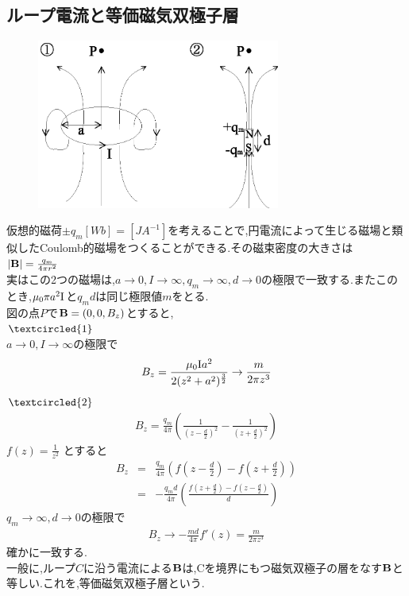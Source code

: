 \documentclass{jsarticle}
\begin{document}
\subsection{ループ電流と等価磁気双極子層}
\begin{figure}[htbp]
 \begin{center}
  \includegraphics[width=80mm]{9.5.eps}
 \end{center}
 \caption{}
 \label{fig:five}
\end{figure}
仮想的磁荷$\pm q_m [Wb]=[JA^{-1}]$を考えることで,円電流によって生じる磁場と類似したCoulomb的磁場をつくることができる.その磁束密度の大きさは
$|{\bf B}|=\frac{q_m}{4 \pi r^2}$ \\
実はこの2つの磁場は,$a \to 0,I \to \infty , q_m \to \infty ,d \to 0 $の極限で一致する.またこのとき,$\mu_0 \pi a^2 {\rm I}$と$q_md$は同じ極限値$m$をとる. \\
図の点$P$で${\bf B}=(0,0,B_z)$とすると, \\
$\textcircled{\scriptsize 1}$ \\
$a \to 0,I \to \infty$の極限で
\begin{eqnarray*}
B_z = \frac{\mu_0 {\rm I} a^2}{2(z^2+a^2)^{\frac{3}{2}}} \to \frac{m}{2 \pi z^3}
\end{eqnarray*}
$\textcircled{\scriptsize 2}$ \\
\begin{eqnarray*}
B_z = \frac{q_m}{4 \pi} \left( \frac{1}{(z-\frac{d}{2})^2} - \frac{1}{(z+\frac{d}{2})^2} \right)
\end{eqnarray*}
$f(z)=\frac{1}{z^2}$ とすると
\begin{eqnarray*}
B_z &=& \frac{q_m}{4 \pi} \left( f(z-\frac{d}{2})-f(z+\frac{d}{2}) \right) \\
&=& -\frac{q_m d}{4 \pi } \left( \frac{ f(z+\frac{d}{2})-f(z-\frac{d}{2}) }{d} \right)
\end{eqnarray*}
$q_m \to \infty ,d \to 0$の極限で
\begin{eqnarray*}
B_z \to -\frac{m d}{4 \pi} f'(z) = \frac{m}{2 \pi z^3}
\end{eqnarray*}
確かに一致する. \\
一般に,ループ$C$に沿う電流による${\bf B}$は,Cを境界にもつ磁気双極子の層をなす${\bf B}$と等しい.これを,等価磁気双極子層という.
\end{document}
